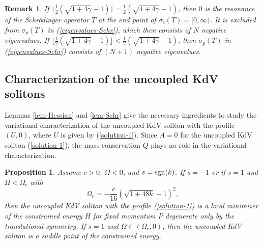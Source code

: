 \documentclass[12pt,reqno]{amsart}
\numberwithin{equation}{section}
\newtheorem{remark}{Remark}
\newtheorem{proposition}{Proposition}
\begin{document}
\begin{remark}
    If $\lfloor \frac{1}{2} (\sqrt{1+4 \gamma} - 1) \rfloor = \frac{1}{2} (\sqrt{1+4 \gamma} - 1)$, then $0$ is the resonance 
    of the Schr\"{o}dinger operator $T$ at the end point of $\sigma_c(T)=[0,\infty)$. It is excluded from $\sigma_p(T)$ in (\ref{eigenvalues-Schr}), 
    which then consists of $N$ negative eigenvalues. 
    If $\lfloor \frac{1}{2} (\sqrt{1+4 \gamma} - 1) \rfloor < \frac{1}{2} (\sqrt{1+4 \gamma} - 1)$, then $\sigma_p(T)$ in (\ref{eigenvalues-Schr}) 
    consists of $(N+1)$ negative eigenvalues.
\end{remark}


\subsection{Characterization of the uncoupled KdV solitons}

Lemmas \ref{lem-Hessian} and \ref{lem-Schr} give the necessary ingredients to study the variational characterization of the uncoupled KdV soliton with the profile $(U,0)$, where $U$ is given by (\ref{solution-1}). Since $A = 0$ for the uncoupled KdV soliton (\ref{solution-1}), the mass conservation $Q$ plays no role in the variational characterization.

\begin{proposition}
    \label{theorem-uncoupled}
Assume $c > 0$, $\Omega < 0$, and $s = {\rm sgn}(k)$. 
If $s = -1$ or if $s = 1$ and $\Omega < \Omega_c$ with 
\begin{equation}
    \label{Omega-c}
    \Omega_c = -\frac{c}{16} \left( \sqrt{1 + 48 k} - 1 \right)^2,
\end{equation}
then the uncoupled KdV soliton with the profile (\ref{solution-1}) is a local minimizer of the constrained energy $H$ 
for fixed momentum $P$ degenerate only by the translational symmetry. 
If $s = 1$ and $\Omega \in (\Omega_c,0)$, 
then the uncoupled KdV soliton is a saddle point of the constrained energy. 
\end{proposition}
\end{document}
